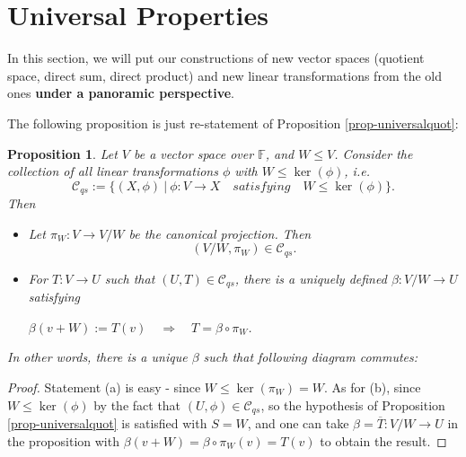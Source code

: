 \documentclass[11pt,openany]{book}
\theoremstyle{plain}
\newtheorem{proposition}[proposition]{Proposition}
\theoremstyle{definition}
\theoremstyle{remark}
\begin{document}
\section{Universal Properties}
In this section, we will put our constructions of new vector spaces (quotient space, direct sum, direct product) and new linear transformations from the old ones {\bf under a panoramic perspective}. 

\medskip
The following proposition is just re-statement of Proposition \ref{prop-universalquot}:
\begin{proposition} \label{prop-quot}
    Let $V$ be a vector space over $\mathbb{F}$, and $W \leq V$. Consider
    the collection of all linear transformations $\phi$ with $W \leq \ker(\phi)$, i.e.
    $$\mathcal{C}_{qs} := \{(X,\phi)\ |\ \phi: V \to X \quad satisfying \quad W \leq \ker(\phi)\}.$$
    Then
    \begin{itemize}
        \item[(a)] Let $\pi_W: V \to V/W$ be the canonical projection. Then
        $$(V/W, \pi_W) \in \mathcal{C}_{qs}.$$
        \item[(b)] For $T: V \to U$ such that $(U,T) \in \mathcal{C}_{qs}$, there is a uniquely defined $\beta: V/W \to U$ satisfying
        \begin{center}
        $\beta(v+W) := T(v) \quad \Rightarrow \quad T = \beta \circ \pi_W$.
        \end{center}
    \end{itemize}
In other words, there is a unique $\beta$ such that following diagram commutes:
\begin{center}
\end{center}
\end{proposition}
\begin{proof}
Statement (a) is easy - since $W \leq \ker(\pi_W) = W$. 
As for (b), since $W \leq \ker(\phi)$ by the fact that $(U,\phi) \in \mathcal{C}_{qs}$, so the hypothesis of Proposition \ref{prop-universalquot} is satisfied with $S = W$, and one can take $\beta = \overline{T}: V/W \to U$ in the proposition with $\beta(v+W) = \beta \circ \pi_W(v) = T(v)$ to obtain the result.
\end{proof}
\end{document}
